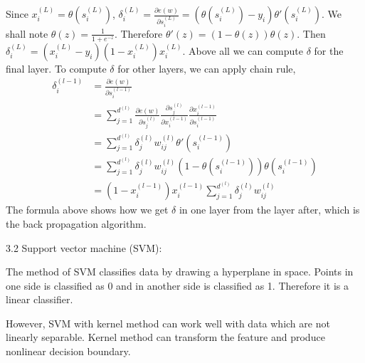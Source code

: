 \documentclass[11pt]{article}
\begin{document}
Since $x_i^{(L)}=\theta(s_i^{(L)})$, $\delta_{i}^{(L)}=\frac{\partial e(w)}{\partial s_i^{(L)}}=(\theta(s_i^{(L)})-y_i)\theta'(s_i^{(L)})$. We shall note $\theta(z)=\frac{1}{1+e^{-z}}$. Therefore $\theta'(z)=(1-\theta(z))\theta(z)$. Then $\delta_{i}^{(L)}=(x_i^{(L)}-y_i)(1-x_i^{(L)})x_i^{(L)}$. Above all we can compute $\delta$ for the final layer. To compute $\delta$ for other layers, we can apply chain rule,
\begin{align*}
\delta_i^{(l-1)}&=\frac{\partial e(w)}{\partial s_i^{(l-1)}}\\
&=\sum_{j=1}^{d^{(l)}}\frac{\partial e(w)}{\partial s_j^{(l)}}\frac{\partial s_j^{(l)}}{\partial x_i^{(l-1)}}\frac{\partial x_i^{(l-1)}}{\partial s_i^{(l-1)}}\\
&=\sum_{j=1}^{d^{(l)}}\delta_j^{(l)}w_{ij}^{(l)}\theta'(s_i^{(l-1)})\\
&=\sum_{j=1}^{d^{(l)}}\delta_j^{(l)}w_{ij}^{(l)}(1-\theta(s_i^{(l-1)}))\theta(s_i^{(l-1)})\\
&=(1-x_i^{(l-1)})x_i^{(l-1)}\sum_{j=1}^{d^{(l)}}\delta_j^{(l)}w_{ij}^{(l)}
\end{align*}  
The formula above shows how we get $\delta$ in one layer from the layer after, which is the back propagation algorithm. 

3.2 Support vector machine (SVM):

The method of SVM classifies data by drawing a hyperplane in space. Points in one side is classified as 0 and in another side is classified as 1. Therefore it is a linear classifier. 

However, SVM with kernel method can work well with data which are not linearly separable. Kernel method can transform the feature and produce nonlinear decision boundary.    

 
\end{document}
